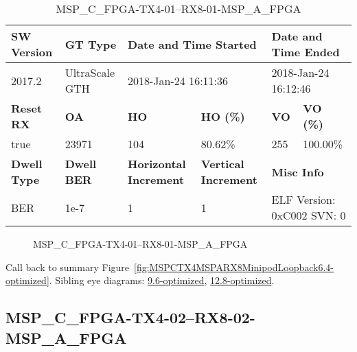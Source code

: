 \begin{table}[h]
\centering
\caption{MSP\_C\_FPGA-TX4-01--RX8-01-MSP\_A\_FPGA}
\label{tab:MSPCFPGATX401RX801MSPAFPGA6.4-optimized}
\begin{tabular}{@{}|l|l|l|l|l|l|@{}}
\toprule
\textbf{SW Version}                & \textbf{GT Type}   & \multicolumn{2}{l|}{\textbf{Date and Time Started}}            & \multicolumn{2}{l|}{\textbf{Date and Time Ended}}        \\ \midrule
2017.2                       & UltraScale GTH          & \multicolumn{2}{l|}{2018-Jan-24 16:11:36}                   & \multicolumn{2}{l|}{2018-Jan-24 16:12:46}               \\ \midrule
\textbf{Reset RX}                  & \textbf{OA} & \textbf{HO}   & \textbf{HO (\%)} & \textbf{VO} & \textbf{VO (\%)} \\ \midrule
true & 23971        & 104          & 80.62\%        & 255        & 100.00\%       \\ \midrule
\textbf{Dwell Type}                & \textbf{Dwell BER} & \textbf{Horizontal Increment} & \textbf{Vertical Increment}    & \multicolumn{2}{l|}{\textbf{Misc Info}}                  \\ \midrule
BER                            & 1e-7        & 1        & 1           & \multicolumn{2}{l|}{ELF Version: 0xC002 SVN: 0}                         \\ \bottomrule
\end{tabular}
\end{table}

\begin{figure}[h]
\caption{MSP\_C\_FPGA-TX4-01--RX8-01-MSP\_A\_FPGA} \label{fig:MSPCFPGATX401RX801MSPAFPGA6.4-optimized}
\end{figure}

Call back to summary Figure~\ref{fig:MSPCTX4MSPARX8MinipodLoopback6.4-optimized}.
Sibling eye diagrams: \hyperref[sec:MSPCFPGATX401RX801MSPAFPGA9.6-optimized]{9.6-optimized}, \hyperref[sec:MSPCFPGATX401RX801MSPAFPGA12.8-optimized]{12.8-optimized}.

\clearpage
\newpage


\subsection{MSP\_C\_FPGA-TX4-02--RX8-02-MSP\_A\_FPGA}\label{sec:MSPCFPGATX402RX802MSPAFPGA6.4-optimized}

